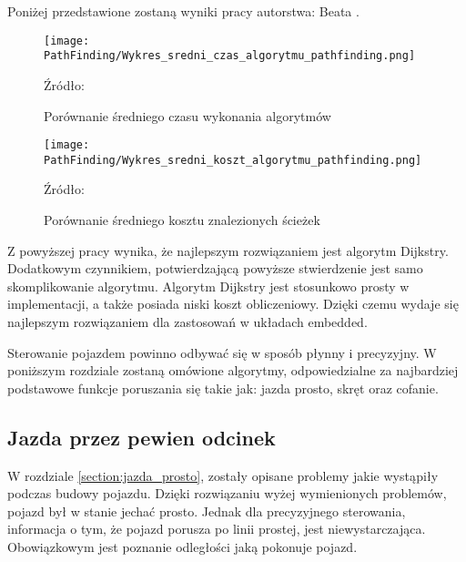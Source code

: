             Poniżej przedstawione zostaną wyniki pracy  \cite{AnalizaAlgorytmówŚcieżek}
            autorstwa: Beata \citeauthor{AnalizaAlgorytmówŚcieżek}.
            \begin{figure}[!ht]
                \centering
                \figurePlotName
                \texttt{[image: PathFinding/Wykres\_sredni\_czas\_algorytmu\_pathfinding.png]}
                \caption{Porównanie średniego czasu wykonania algorytmów}
                Źródło:\cite{AnalizaAlgorytmówŚcieżek}  
                \label{fig:PathFindingTime}
            \end{figure}
            \begin{figure}[!ht]
                \centering
                \figurePlotName
                \texttt{[image: PathFinding/Wykres\_sredni\_koszt\_algorytmu\_pathfinding.png]}
                \caption{Porównanie średniego kosztu znalezionych ścieżek}
                Źródło:\cite{AnalizaAlgorytmówŚcieżek} 
                \label{fig:PathFindingCost}
            \end{figure}
            
            Z powyższej pracy wynika, że najlepszym rozwiązaniem jest algorytm Dijkstry.
            Dodatkowym czynnikiem, potwierdzającą powyższe stwierdzenie jest samo skomplikowanie algorytmu.
            Algorytm Dijkstry jest stosunkowo prosty w implementacji, a także posiada niski koszt obliczeniowy.
            Dzięki czemu wydaje się najlepszym rozwiązaniem dla zastosowań w układach embedded.



    
    Sterowanie pojazdem powinno odbywać się w sposób płynny i precyzyjny.
    W poniższym rozdziale zostaną omówione algorytmy, odpowiedzialne za najbardziej podstawowe funkcje poruszania się takie jak: jazda prosto, skręt oraz cofanie.

    \subsection{Jazda przez pewien odcinek}
    \label{subsec:sterowanie_odległość}
        W rozdziale \ref{section:jazda_prosto}, zostały opisane problemy jakie wystąpiły podczas budowy pojazdu. %
        Dzięki rozwiązaniu wyżej wymienionych problemów, pojazd był w stanie jechać prosto.
        Jednak dla precyzyjnego sterowania, informacja o tym, że pojazd porusza po linii prostej, jest niewystarczająca.
        Obowiązkowym jest poznanie odległości jaką pokonuje pojazd.

